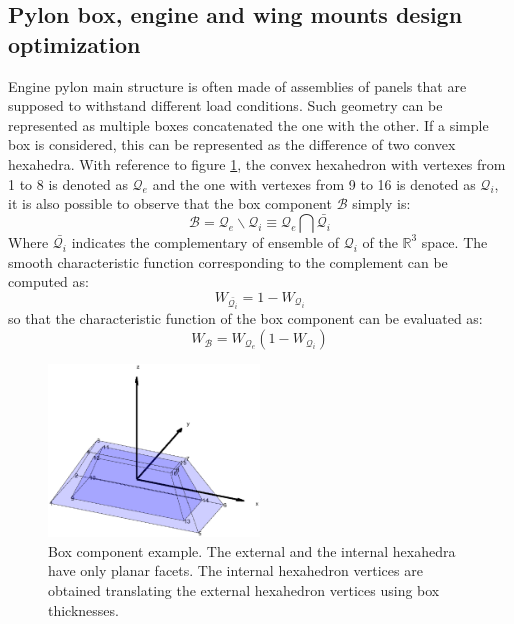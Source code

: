  \subsection{Pylon box, engine and wing mounts design optimization}
  \label{ss3.10.4}
  Engine pylon main structure is often made of assemblies of panels that are supposed to withstand different load conditions. Such geometry can be represented as multiple boxes concatenated the one with the other. If a simple box is considered, this can be represented as the difference of two convex hexahedra. With reference to figure \ref{fig:3.40}, the convex hexahedron with vertexes from 1 to 8 is denoted as $\mathscr{Q}_{e}$ and the one with vertexes from 9 to 16 is denoted as $\mathscr{Q}_{i}$, it is also possible to observe that the box component  $\mathscr{B}$ simply is:
  \begin{equation}
\mathscr{B}=\mathscr{Q}_{e}\backslash\mathscr{Q}_{i}\equiv \mathscr{Q}_{e}\bigcap\bar{\mathscr{Q}_{i}}
  \end{equation}
  Where $\bar{\mathscr{Q}_{i}}$ indicates the complementary of ensemble of $\mathscr{Q}_{i}$ of the $\mathbb{R}^3$ space. 
  The smooth characteristic function corresponding to the complement can be computed as:
    \begin{equation}
 W_{\bar{\mathscr{Q}_{i}}}=1-W_{\mathscr{Q}_{i}}
    \end{equation}
    so that the characteristic function of the box component can be evaluated as:
   \begin{equation}
     W_{\mathscr{B}}=W_{\mathscr{Q}_{e}}(1-W_{\mathscr{Q}_{i}})
    \end{equation}
  \begin{figure}[!ht]
       \centering
        \includegraphics[width=0.5\textwidth]{images/Ch3/box_component_plot}
      \caption{Box component example. The external and the internal hexahedra have only planar facets. The internal hexahedron vertices are obtained translating the external hexahedron vertices using box thicknesses.}
      \label{fig:3.40}       %
 \end{figure}
